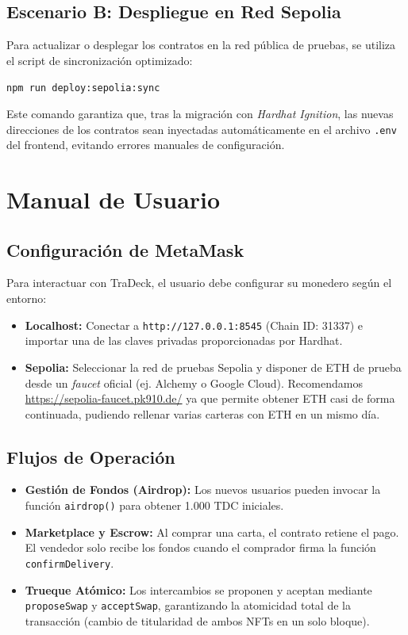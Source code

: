 \subsection{Escenario B: Despliegue en Red Sepolia}
Para actualizar o desplegar los contratos en la red pública de pruebas, se utiliza el script de sincronización optimizado:
\begin{center}
	\texttt{npm run deploy:sepolia:sync}
\end{center}
Este comando garantiza que, tras la migración con \textit{Hardhat Ignition}, las nuevas direcciones de los contratos sean inyectadas automáticamente en el archivo \texttt{.env} del frontend, evitando errores manuales de configuración.

\section{Manual de Usuario}
\subsection{Configuración de MetaMask}
Para interactuar con TraDeck, el usuario debe configurar su monedero según el entorno:
\begin{itemize}
	\item \textbf{Localhost:} Conectar a \texttt{http://127.0.0.1:8545} (Chain ID: 31337) e importar una de las claves privadas proporcionadas por Hardhat.
	\item \textbf{Sepolia:} Seleccionar la red de pruebas Sepolia y disponer de ETH de prueba desde un \textit{faucet} oficial (ej. Alchemy o Google Cloud). Recomendamos \url{https://sepolia-faucet.pk910.de/} ya que permite obtener ETH casi de forma continuada, pudiendo rellenar varias carteras con ETH en un mismo día.
\end{itemize}

\subsection{Flujos de Operación}
\begin{itemize}
	\item \textbf{Gestión de Fondos (Airdrop):} Los nuevos usuarios pueden invocar la función \texttt{airdrop()} para obtener 1.000 TDC iniciales.
	\item \textbf{Marketplace y Escrow:} Al comprar una carta, el contrato retiene el pago. El vendedor solo recibe los fondos cuando el comprador firma la función \texttt{confirmDelivery}.
	\item \textbf{Trueque Atómico:} Los intercambios se proponen y aceptan mediante \texttt{proposeSwap} y \texttt{acceptSwap}, garantizando la atomicidad total de la transacción (cambio de titularidad de ambos NFTs en un solo bloque).
\end{itemize}


